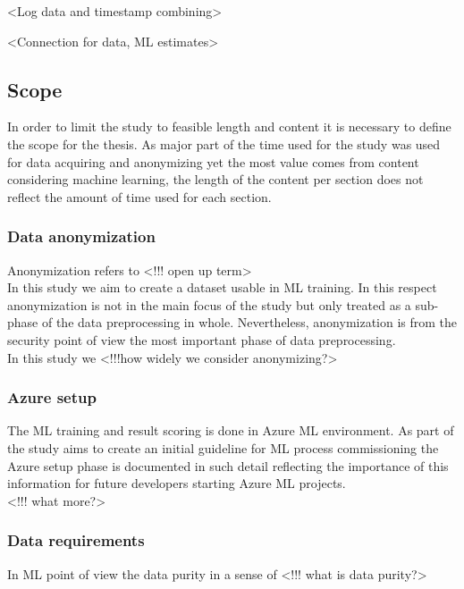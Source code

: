 \documentclass[english, 12pt, a4paper, elec, utf8, a-1b, online]{aaltothesis}
\begin{document}
<Log data and timestamp combining>

<Connection for data, ML estimates>

\subsection{Scope}

In order to limit the study
to feasible length and content
it is necessary to define the scope for the thesis.
As major part of the time used for the study
was used for data acquiring and anonymizing
yet the most value comes from
content considering machine learning,
the length of the content per section
does not reflect
the amount of time used for each section.

\subsubsection*{Data anonymization}
Anonymization refers to <!!! open up term>
\\
In this study we aim to
create a dataset usable in ML training.
In this respect
anonymization is not in the main focus of the study
but only treated as a sub-phase
of the data preprocessing in whole.
Nevertheless,
anonymization is from the security point of view
the most important phase of data preprocessing.
\\
In this study we <!!!how widely we consider anonymizing?>

\subsubsection*{Azure setup}
The ML training and result scoring
is done in Azure ML environment.
As part of the study aims to create
an initial guideline for
ML process commissioning
the Azure setup phase is documented in such detail
reflecting the importance of this information
for future developers
starting Azure ML projects.
\\
<!!! what more?>

\subsubsection*{Data requirements}
In ML point of view
the data purity in a sense of
<!!! what is data purity?>
\end{document}
